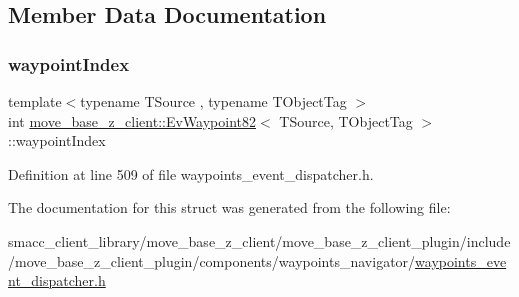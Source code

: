 \subsection{Member Data Documentation}
\mbox{\label{structmove__base__z__client_1_1EvWaypoint82_aa54b98fcf1cf08bd3a694f815614599c}} 
\subsubsection{\texorpdfstring{waypoint\+Index}{waypointIndex}}
{\footnotesize\ttfamily template$<$typename T\+Source , typename T\+Object\+Tag $>$ \\
int \hyperlink{structmove__base__z__client_1_1EvWaypoint82}{move\+\_\+base\+\_\+z\+\_\+client\+::\+Ev\+Waypoint82}$<$ T\+Source, T\+Object\+Tag $>$\+::waypoint\+Index}



Definition at line 509 of file waypoints\+\_\+event\+\_\+dispatcher.\+h.



The documentation for this struct was generated from the following file\+:\begin{DoxyCompactItemize}
\item 
smacc\+\_\+client\+\_\+library/move\+\_\+base\+\_\+z\+\_\+client/move\+\_\+base\+\_\+z\+\_\+client\+\_\+plugin/include/move\+\_\+base\+\_\+z\+\_\+client\+\_\+plugin/components/waypoints\+\_\+navigator/\hyperlink{waypoints__event__dispatcher_8h}{waypoints\+\_\+event\+\_\+dispatcher.\+h}\end{DoxyCompactItemize}
